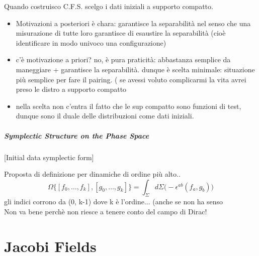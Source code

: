 \documentclass[Main]{subfiles}
\begin{document}
\begin{Warning}
		Quando costruisco C.F.S. scelgo i dati iniziali a supporto compatto.
			\begin{itemize}
				\item Motivazioni a posteriori è chara: garantisce la separabilità nel senso che una misurazione di tutte loro garantisce di esaustire la separabilità (cioè identificare in modo univoco una configurazione)
				\item c'è motivazione a priori? no, è pura praticità: abbastanza semplice da maneggiare + garantisce la separabilità. dunque è scelta minimale: situazione più semplice per fare il pairing. ( se avessi voluto complicarmi la vita avrei preso le distro a supporto compatto
				\item nella scelta non c'entra il fatto che le sup compatto sono funzioni di test, dunque sono il duale delle distribuzioni come dati iniziali.
			\end{itemize}
		\end{Warning}
				\paragraph{Symplectic Structure on the Phase Space}
				[Initial data symplectic form]			
			\begin{Warning}
				Proposta di definizione per dinamiche di ordine più alto..
				\begin{displaymath}
					\Omega \biggr\{ [f_0,\ldots, f_k] , [g_0,\ldots, g_k] \biggr\} =
					\int_\Sigma d\Sigma  \biggr(-\epsilon^{ab}(f_a,g_b) \biggr)
				\end{displaymath}
				gli indici corrono da (0, k-1) dove k è l'ordine... (anche se non ha senso \\
				Non va bene perchè non riesce a tenere conto del campo di Dirac!
			\end{Warning}


\chapter{Jacobi Fields}
\end{document}
